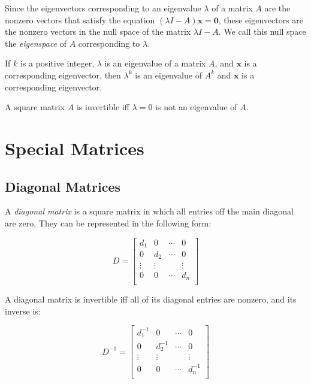 \documentclass{report}
\begin{document}
		Since the eigenvectors corresponding to an eigenvalue $\lambda$ of a matrix $A$  are the nonzero vectors that satisfy the equation $(\lambda I-A)\bm{x}=\bm{0}$, these eigenvectors are the nonzero vectors in the null space of the matrix $\lambda I-A$. We call this null space the \emph{eigenspace} of $A$ corresponding to $\lambda$.
		
		\begin{thm}
			If $k$ is a positive integer, $\lambda$ is an eigenvalue of a matrix $A$, and $\bm{x}$ is a corresponding eigenvector, then $\lambda^k$ is an eigenvalue of $A^k$ and $\bm{x}$ is a corresponding eigenvector.
		\end{thm}
		
		\begin{thm}
			A square matrix $A$ is invertible iff $\lambda=0$ is not an eigenvalue of $A$.
		\end{thm}
	
	\section{Special Matrices}
		\subsection{Diagonal Matrices}
		A \emph{diagonal matrix} is a square matrix in which all entries off the main diagonal are zero. They can be represented in the following form:
		
		\begin{displaymath}
		D=
		\begin{bmatrix}
		d_1 & 0 & \cdots & 0 \\
		0 & d_2 & \cdots & 0 \\
		\vdots & \vdots &        & \vdots \\
		0 & 0 & \cdots & d_n \\
		\end{bmatrix}
		\end{displaymath}
		
		A diagonal matrix is invertible iff all of its diagonal entries are nonzero, and its inverse is:
		
		\begin{displaymath}
		D^{-1}=
		\begin{bmatrix}
		d_1^{-1} & 0 & \cdots & 0 \\
		0 & d_2^{-1} & \cdots & 0 \\
		\vdots & \vdots &        & \vdots \\
		0 & 0 & \cdots & d_n^{-1} \\
		\end{bmatrix}
		\end{displaymath}
		
\end{document}
